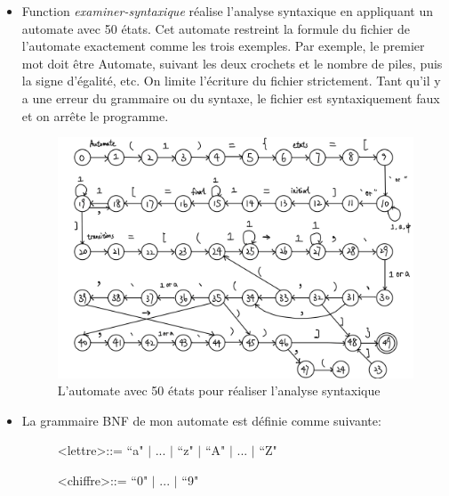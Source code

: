 \documentclass[a4paper,14pt,UTF8]{article}
\begin{document}
	
	\begin{itemize}
		
		\item 
		Function \textit{examiner-syntaxique} réalise l'analyse syntaxique en appliquant un automate avec 50 états. Cet automate restreint la formule du fichier de l'automate exactement comme les trois exemples. Par exemple, le premier mot doit être Automate, suivant les deux crochets et le nombre de piles, puis la signe d'égalité, etc. On limite l'écriture du fichier strictement. Tant qu'il y a une erreur du grammaire ou du syntaxe, le fichier est syntaxiquement faux et on arrête le programme. 
		
		\begin{figure}[H]
			\setlength{\abovecaptionskip}{-0.cm}
			
			\begin{center}
				\includegraphics[width=16cm]{analyse_syntaxique}
			\end{center}
			\caption{L'automate avec 50 états pour réaliser l'analyse syntaxique}
		\end{figure}
		
		
		\item 
		La grammaire BNF de mon automate est définie comme suivante: 
		
			\begin{description}
				
				\item[] \textless lettre\textgreater ::= ``a" $|$ ... $|$ ``z" $|$ ``A" $|$ ... $|$ ``Z" \par
				
				\item[] \textless chiffre\textgreater ::= ``0" $|$ ... $|$ ``9" \par
				

\end{description}
\end{itemize}
\end{document}
